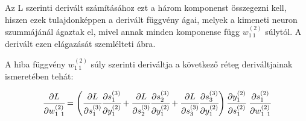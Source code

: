 Az L szerinti derivált számításához ezt a három komponenst összegezni kell, hiszen ezek tulajdonképpen a derivált függvény ágai, melyek a kimeneti neuron szummájánál ágaztak el, mivel annak minden komponense függ $w^{(2)}_{1~1}$ súlytól. A derivált ezen elágazását szemlélteti  ábra.

A hiba függvény $w^{(2)}_{1~1}$ súly szerinti deriváltja a következő réteg deriváltjainak ismeretében tehát:

\begin{equation}
    \cfrac{\partial L}{\partial w^{(2)}_{1~1}} = \left(\cfrac{\partial L}{\partial s^{(3)}_1}\cfrac{\partial s^{(3)}_1}{\partial y^{(2)}_1} + \cfrac{\partial L}{\partial s^{(3)}_2}\cfrac{\partial s^{(3)}_2}{\partial y^{(2)}_1} +\cfrac{\partial L}{\partial s^{(3)}_3} \cfrac{\partial s^{(3)}_3}{\partial y^{(2)}_1}\right)\cfrac{\partial y^{(2)}_1}{\partial s^{(2)}_1}~\cfrac{\partial s^{(2)}_1}{\partial w^{(2)}_{1~1}} 
\end{equation}

